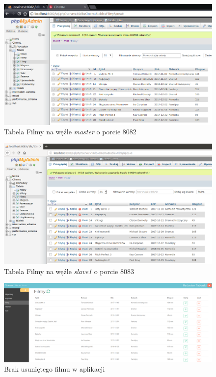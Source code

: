 \begin{figure} [H]
	\centering
	\includegraphics[width=1\linewidth]{rozdzial06/r2.png}
	\caption{Tabela Filmy na węźle \textit{master} o porcie 8082}
	\label{fig:FilmMasterRemove}
\end{figure}

\begin{figure} [H]
	\centering
	\includegraphics[width=1\linewidth]{rozdzial06/r3.png}
	\caption{Tabela Filmy na węźle \textit{slave1} o porcie 8083}
	\label{fig:FilmSlaveRemove}
\end{figure}

\begin{figure} [H]
	\centering
	\includegraphics[width=1\linewidth]{rozdzial06/r4.png}
	\caption{Brak usuniętego filmu w aplikacji}
	\label{fig:endRemoveFilm}
\end{figure}



